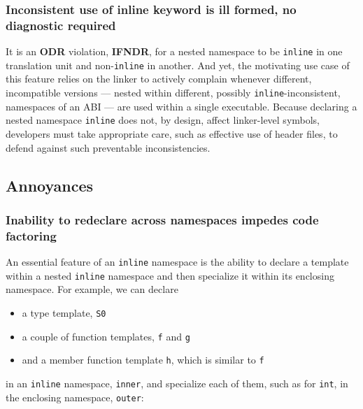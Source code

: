 \subsubsection[Inconsistent use of {\tt inline} keyword is \textbf{ill formed, no diagnostic required}]{Inconsistent use of {\SubsubsecCode inline} keyword is \textbf{ill formed, no diagnostic required}}\label{inconsistent-use-of-inline-keyword-is-ifndr}

It is an \textbf{ODR} violation, \textbf{IFNDR}, for a nested namespace
to be \texttt{inline} in one translation unit and non-\texttt{inline} in
another. And yet, the motivating use case of this feature relies on the
linker to actively complain whenever different, incompatible versions
--- nested within different, possibly \texttt{inline}-inconsistent,
namespaces of an ABI --- are used within a single executable. Because
declaring a nested namespace \texttt{inline} does not, by design, affect
linker-level symbols, developers must take appropriate care, such as
effective use of header files, to defend against such preventable
inconsistencies.

\subsection[Annoyances]{Annoyances}\label{annoyances-inlinenamespace}

\subsubsection[Inability to redeclare across namespaces impedes code factoring]{Inability to redeclare across namespaces impedes code factoring}\label{inability-to-redeclare-across-namespaces-impedes-code-factoring}

An essential feature of an \texttt{inline} namespace is the ability to
declare a template within a nested \texttt{inline} namespace and then
specialize it within its enclosing namespace. For example, we can
declare
\begin{itemize}
\item{a type template, \texttt{S0}}
\item{a couple of function templates, \texttt{f} and \texttt{g}}
\item{and a member function template \texttt{h}, which is similar to \texttt{f}}
\end{itemize}
in an \texttt{inline} namespace, \texttt{inner}, and specialize each of
them, such as for \texttt{int}, in the enclosing namespace,
\texttt{outer}:

